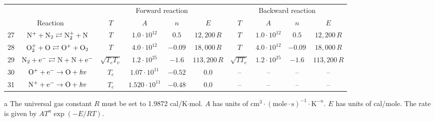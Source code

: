 \documentclass{warpdoc}
\renewcommand{\fontsizetable}{\footnotesize\scalefont{0.9}}
\begin{document}
\begin{table}[t]
\fontsizetable
\begin{center}
\begin{threeparttable}
\begin{tabular}{cccccccccc} 
\toprule
~&~&\multicolumn{4}{c}{Forward reaction} & \multicolumn{4}{c}{Backward reaction} \\
 \cmidrule(lr){3-6}\cmidrule(lr){7-10}
\multicolumn{2}{c}{Reaction} & $T$ & $A$ & $n$ & $E$ & $T$  & $A$ & $n$ & $E$ \\ 
\midrule                                          
27 & $\rm N^{+} + N_2 \rightleftarrows N_2^{+} + N $ &$T$ & $1.0 \cdot 10^{12}$ & $0.5$ & $12,200\, R$ 
                                          &$T$ & $1.0 \cdot 10^{12}$ & $0.5$ & $12,200\, R$\\
                                          
28 & $\rm O_2^{+} + O \rightleftarrows O^{+} + O_2$ &$T$ & $4.0 \cdot 10^{12}$ & $-0.09$ & $18,000\, R$ 
                                          &$T$ & $4.0 \cdot 10^{12}$ & $-0.09$ & $18,000\, R$\\
                                          
                                          
29 & $\rm N_2 + e^{-} \rightleftarrows N + N + e^{-}$ &$\sqrt{T_e T_v}$ & $1.2 \cdot 10^{25}$ & $-1.6$ & $113,200\, R$ 
                                          &$\sqrt{T T_e}$ & $1.2 \cdot 10^{25}$ & $-1.6$ & $113,200\, R$\\
                                          
30 & $\rm O^+ + e^- \rightarrow O + {\it hv} $ &$T_e$ & $1.07 \cdot 10^{11}$ & $-0.52$ & $0.0$ 
                                          &-- & -- & -- & --\\ 
                                          
31 & $\rm N^+ + e^- \rightarrow O + {\it hv} $ &$T_e$ & $1.520 \cdot 10^{11}$ & $-0.48$ & $0.0$ 
                                          &-- & -- & -- & --\\                                                                                    
\bottomrule
\end{tabular}
\begin{tablenotes}
\item[{a}] The universal gas constant $R$ must be set to 1.9872	cal/K$\cdot$mol. $A$ has units of $\textrm{cm}^3\cdot(\textrm{mole}\cdot \textrm{s})^{-1}\cdot \textrm{K}^{-n}$. $E$ has units of cal/mole. The rate is given by $A T^n \exp(-E/RT).$
\end{tablenotes}
\label{tab:kim2021b}
\end{threeparttable}
\end{center}
\end{table}
%
\end{document}

